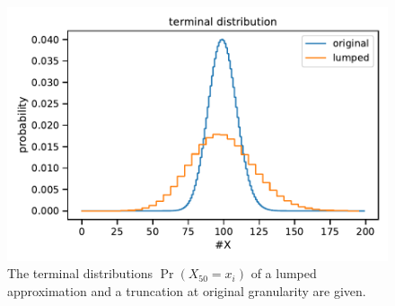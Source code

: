\begin{figure}
    \centering
    \includegraphics[scale=.6]{gfx/lumped_dist.pdf}
	\caption[Distribution of a lumped approximation]{The terminal distributions $\Pr(X_{50}=x_i)$ of a lumped approximation and a truncation at original granularity are given.}
    \label{fig:lumped_terminal}
\end{figure}
